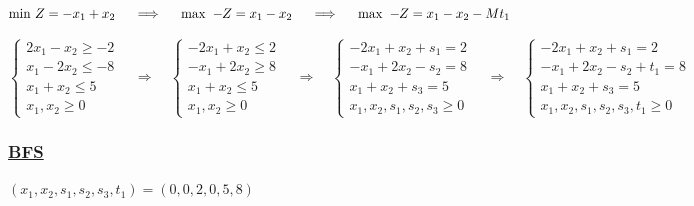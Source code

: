 \vspace{1cm}

\[\text{min } Z = -x_1 + x_2 \hspace{0.5cm} \Longrightarrow \hspace{0.5cm} \text{max } -\hspace{-0.1cm}Z = x_1 - x_2  \hspace{0.5cm} \Longrightarrow \hspace{0.5cm} \text{max } -\hspace{-0.1cm}Z = x_1 - x_2 - Mt_1\] 

\[
\left\{
\begin{array}{l}
    2x_{1} - x_{2} \geq -2 \\
    x_{1} - 2x_{2} \leq -8 \\
    x_{1} + x_{2} \leq 5 \\
    x_{1}, x_{2} \geq 0
\end{array}
\right.
\quad
\Longrightarrow
\quad
\left\{
\begin{array}{l}
    -2x_{1} + x_{2} \leq 2 \\
    -x_{1} + 2x_{2} \geq 8 \\
    x_{1} + x_{2} \leq 5 \\
    x_{1}, x_{2} \geq 0
\end{array}
\right.
\quad
\Longrightarrow
\quad
\left\{
\begin{array}{l}
    -2x_{1} + x_{2} + s_{1} = 2 \\
    -x_{1} + 2x_{2} - s_{2} = 8 \\
    x_{1} + x_{2} + s_{3} = 5 \\
    x_{1}, x_{2}, s_{1}, s_{2}, s_{3} \geq 0
\end{array}
\right.
\quad
\Longrightarrow
\quad
\left\{
\begin{array}{l}
    -2x_{1} + x_{2} + s_{1} = 2 \\
    -x_{1} + 2x_{2} - s_{2} + t_{1} = 8 \\
    x_{1} + x_{2} + s_{3} = 5 \\
    x_{1}, x_{2}, s_{1}, s_{2}, s_{3}, t_{1} \geq 0
\end{array}
\right.



\]

\vspace{1cm}

\subsubsection*{\underline{BFS}}
\((x_1,x_2,s_1,s_2,s_3,t_1) = (0,0,2,0,5,8)\)


